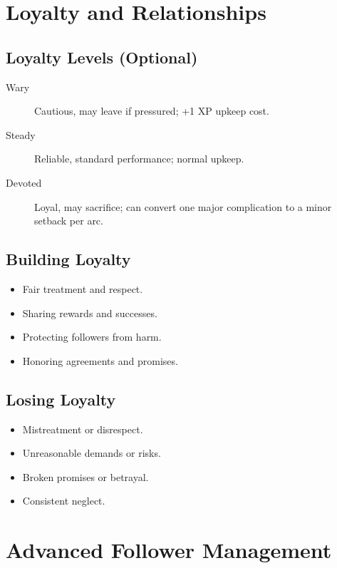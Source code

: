 \section{Loyalty and Relationships}
\label{sec:follower-loyalty}

\subsection*{Loyalty Levels (Optional)}
\label{sec:loyalty-levels}
\begin{description}
\item[Wary] Cautious, may leave if pressured; +1 XP upkeep cost.
\item[Steady] Reliable, standard performance; normal upkeep.
\item[Devoted] Loyal, may sacrifice; can convert one major complication to a minor setback per arc.
\end{description}

\subsection*{Building Loyalty}
\label{sec:building-loyalty}
\begin{itemize}
\item Fair treatment and respect.
\item Sharing rewards and successes.
\item Protecting followers from harm.
\item Honoring agreements and promises.
\end{itemize}

\subsection*{Losing Loyalty}
\label{sec:losing-loyalty}
\begin{itemize}
\item Mistreatment or disrespect.
\item Unreasonable demands or risks.
\item Broken promises or betrayal.
\item Consistent neglect.
\end{itemize}

\section{Advanced Follower Management}
\label{sec:advanced-followers}

